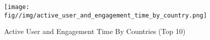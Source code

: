 \begin{figure}
    \centering
    \texttt{[image: fig//img/active\_user\_and\_engagement\_time\_by\_country.png]}
    \caption{Active User and Engagement Time By Countries (Top 10)}
    \label{fig:active_user_and_engagement_time_by_country}
\end{figure}